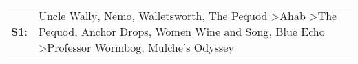 \begin{supertabular}{p{0.03\textwidth}p{0.92\textwidth}}
 \textbf{S1}:  &  Uncle Wally\textsuperscript{}, \enspace Nemo\textsuperscript{}, \enspace Walletsworth\textsuperscript{}, \enspace The Pequod\textsuperscript{} \textgreater \enspace Ahab\textsuperscript{} \textgreater \enspace The Pequod\textsuperscript{}, \enspace Anchor Drops\textsuperscript{}, \enspace Women Wine and Song\textsuperscript{}, \enspace Blue Echo\textsuperscript{} \textgreater \enspace Professor Wormbog\textsuperscript{}, \enspace Mulche's Odyssey\textsuperscript{}  \enspace  \\
\end{supertabular}
